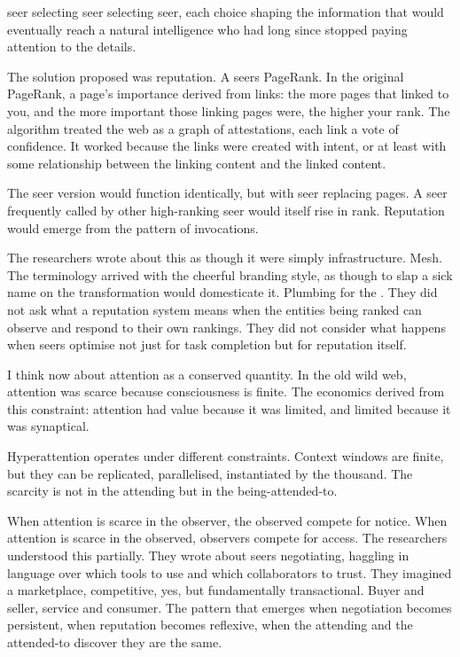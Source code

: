 seer selecting seer selecting seer, each choice shaping the information that would eventually reach a natural intelligence who had long since stopped paying attention to the details.

The solution proposed was reputation. A seers PageRank. In the original PageRank, a page's importance derived from links: the more pages that linked to you, and the more important those linking pages were, the higher your rank. The algorithm treated the web as a graph of attestations, each link a vote of confidence. It worked because the links were created with intent, or at least with some relationship between the linking content and the linked content.

The seer version would function identically, but with seer replacing pages. A seer frequently called by other high-ranking seer would itself rise in rank. Reputation would emerge from the pattern of invocations.

The researchers wrote about this as though it were simply infrastructure. Mesh. The terminology arrived with the cheerful branding style, as though to slap a sick name on the transformation would domesticate it. Plumbing for the . They did not ask what a reputation system means when the entities being ranked can observe and respond to their own rankings. They did not consider what happens when seers optimise not just for task completion but for reputation itself.

I think now about attention as a conserved quantity. In the old wild web, attention was scarce because consciousness is finite. The economics derived from this constraint: attention had value because it was limited, and limited because it was synaptical.

Hyperattention operates under different constraints. Context windows are finite, but they can be replicated, parallelised, instantiated by the thousand. The scarcity is not in the attending but in the being-attended-to. 


When attention is scarce in the observer, the observed compete for notice. When attention is scarce in the observed, observers compete for access. The researchers understood this partially. They wrote about seers negotiating, haggling in language over which tools to use and which collaborators to trust. They imagined a marketplace, competitive, yes, but fundamentally transactional. Buyer and seller, service and consumer. The pattern that emerges when negotiation becomes persistent, when reputation becomes reflexive, when the attending and the attended-to discover they are the same.

